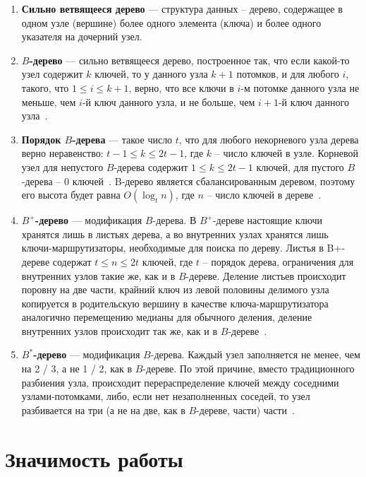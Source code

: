 \documentclass{llncs}
\begin{document}
	\begin{enumerate}
		\item \textbf{Сильно ветвящееся дерево} --- структура данных – дерево, содержащее в одном узле (вершине) более одного элемента (ключа) и более одного указателя на дочерний узел.
		\item \textbf{$B$-дерево} --- сильно ветвящееся дерево, построенное так, что если какой-то узел содержит $k$ ключей, то у данного узла $k+1$ потомков, и для любого $i$, такого, что $1\leq i\leq k+1$, верно, что все ключи в $i$-м потомке данного узла не меньше, чем $i$-й ключ данного узла, и не больше, чем $i+1$-й ключ данного узла~\cite{Kormen}.
		\item \textbf{Порядок $B$-дерева} --- такое число $t$, что для любого некорневого узла дерева верно неравенство: $t-1\leq k\leq 2t-1$, где $k$ – число ключей в узле. Корневой узел для непустого $B$-дерева содержит $1\leq k\leq 2t-1$ ключей, для пустого $B$-дерева – 0 ключей~\cite{Kormen}. B-дерево является сбалансированным деревом, поэтому его высота будет равна $O(\log_t n)$, где $n$ – число ключей в дереве~\cite{Kormen}.
		\item \textbf{$B^+$-дерево} --- модификация $B$-дерева. В $B^+$-дереве настоящие ключи хранятся лишь в листьях дерева, а во внутренних узлах хранятся лишь ключи-маршрутизаторы, необходимые для поиска по дереву. Листья в B+-дереве содержат $t\leq n\leq 2t$ ключей, где $t$ – порядок дерева, ограничения для внутренних узлов такие же, как и в $B$-дереве. Деление листьев происходит поровну на две части, крайний ключ из левой половины делимого узла копируется в родительскую вершину в качестве ключа-маршрутизатора аналогично перемещению медианы для обычного деления, деление внутренних узлов происходит так же, как и в $B$-дереве~\cite{Kerttu}.
		\item \textbf{$B^*$-дерево} --- модификация $B$-дерева. Каждый узел заполняется не менее, чем на 2 / 3, а не 1 / 2, как в $B$-дереве. По этой причине, вместо традиционного разбиения узла, происходит перераспределение ключей между соседними узлами-потомками, либо, если нет незаполненных соседей, то узел разбивается на три (а не на две, как в $B$-дереве, части) части~\cite{Nist}.
	\end{enumerate}
    
    \vspace{-1em}
	
	\section{Значимость работы}
	
\end{document}
